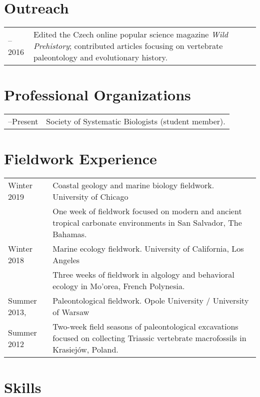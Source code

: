 \documentclass[10pt]{article}
\begin{document}
\section*{Outreach}

\begin{tabularx}{\textwidth}{>{\raggedleft\arraybackslash}p{2.2cm} X}
2015--2016 & Edited the Czech online popular science magazine \textit{Wild Prehistory}; contributed articles focusing on vertebrate paleontology and evolutionary history.
\end{tabularx}

\section*{Professional Organizations}

\begin{tabularx}{\textwidth}{>{\raggedleft\arraybackslash}p{2.2cm} X}
2017--Present & Society of Systematic Biologists (student member).
\end{tabularx}

\section*{Fieldwork Experience}

\begin{tabularx}{\textwidth}{>{\raggedleft\arraybackslash}p{2.2cm} X}
Winter 2019 & Coastal geology and marine biology fieldwork. University of Chicago \\
& One week of fieldwork focused on modern and ancient tropical carbonate environments in San Salvador, The Bahamas. \\[0.1cm]
Winter 2018 & Marine ecology fieldwork. University of California, Los Angeles \\
& Three weeks of fieldwork in algology and behavioral ecology in Mo'orea, French Polynesia. \\[0.1cm]
Summer 2013, & Paleontological fieldwork. Opole University / University of Warsaw \\
Summer 2012 & Two-week field seasons of paleontological excavations focused on collecting Triassic vertebrate macrofossils in Krasiej\'{o}w, Poland.
\end{tabularx}

\section*{Skills}
\end{document}
